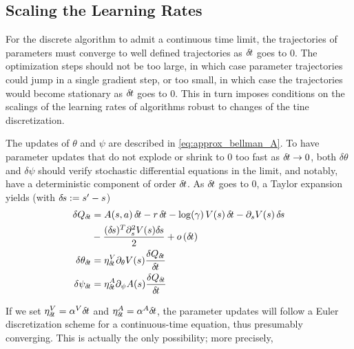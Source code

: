 
\subsection{Scaling the Learning Rates}
\label{subsec:lr}

For the discrete algorithm to admit a continuous time limit, the trajectories
of parameters must converge to well defined trajectories as ${\delta\hspace{-.1em}t}$ goes to
$0$.  The optimization steps should not be too large,
in which case parameter trajectories could jump in a single gradient step,
or too small, in which case the trajectories would become stationary as
${\delta\hspace{-.1em}t}$ goes to $0$.  This in turn imposes conditions on the scalings of the
learning rates of algorithms robust to changes of the tine discretization.

The updates of $\theta$ and $\psi$ are described in
\eqref{eq:approx_bellman_A}.  To have parameter updates that do not explode or shrink to $0$ too
fast as ${\delta\hspace{-.1em}t} \rightarrow 0$, both $\delta \theta$ and
$\delta \psi$ should verify stochastic differential equations in the
limit, and notably,
have a deterministic component of order ${\delta\hspace{-.1em}t}$. As ${\delta\hspace{-.1em}t}$ goes to $0$,
a Taylor expansion yields (with ${\delta\hspace{-.1em}s}\mathrel{\mathop{:}}= s'-s$)
\begin{align}
	\delta Q_\deltat &= A(s, a)\,\deltat - r\,\deltat - \log(\gamma)
	\,V(s)\,\deltat - \partial_s V(s) \,\deltas\nonumber \\&- \frac{(\deltas)^T \partial_{s}^2 V(s) \deltas}{2} + \smallo\left(\deltat\right)\\
	\delta \theta_\deltat &= \eta^V_\deltat \partial_{\theta} V(s)
	\frac{\delta Q_\deltat}{\deltat} \\%
	\delta \psi_\deltat &= \eta^A_\deltat \partial_{\psi} A(s)
	\frac{\delta Q_\deltat}{\deltat} %
\end{align}

If we set 
$\eta^V_{\delta\hspace{-.1em}t} = \alpha^V {\delta\hspace{-.1em}t}$ and $\eta^A_{\delta\hspace{-.1em}t} = \alpha^A
{\delta\hspace{-.1em}t}$, the parameter updates will follow a Euler discretization scheme
for a continuous-time equation, thus presumably converging. This is
actually the only possibility; more precisely,

